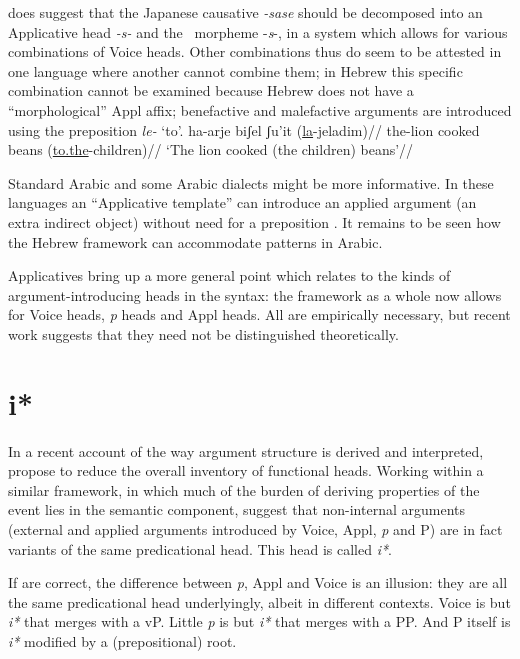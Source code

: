 \cite{oseki16nyu} does suggest that the Japanese causative \emph{-sase} should be decomposed into an Applicative head \emph{-s-} and the \vd~morpheme -\emph{s}-{, in a system which allows for various combinations of Voice heads}. Other combinations thus do seem to be attested in one language where another cannot combine them; in Hebrew this {specific }combination cannot be examined because Hebrew does not have a ``morphological'' Appl affix; benefactive and malefactive arguments are introduced using the preposition \emph{le-} `to'.
\ex \begingl
    \gla ha-arje biʃel ʃu'it (\underline{la}-jeladim)//
    \glb the-lion cooked beans (\underline{to.the}-children)//
    \glft `The lion cooked (the children) beans'//
    \endgl
\xe

Standard Arabic and some Arabic dialects might be more informative. In these languages an ``Applicative template'' can introduce an applied argument (an extra indirect object) without need for a preposition \citep{alkaabi12}. It remains to be seen how the Hebrew framework can accommodate patterns in Arabic.

Applicatives bring up a more general point which relates to the kinds of argument-introducing heads in the syntax: the framework as a whole now allows for Voice heads, \emph{p} heads and Appl heads. All are empirically necessary, but recent work suggests that they need not be distinguished theoretically.


\section{i*} \label{i:i}
In a recent account of the way argument structure is derived and interpreted, \cite{woodmarantz15} propose to reduce the overall inventory of functional heads. Working within a similar framework, in which much of the burden of deriving properties of the event lies in the semantic component, \citeauthor{woodmarantz15} suggest that non-internal arguments (external and applied arguments introduced by Voice, Appl, \emph{p} and P) are in fact variants of the same predicational head. This head is called \emph{i*}.

If \cite{woodmarantz15} are correct, the difference between \emph{p}, Appl and Voice is an illusion: they are all the same predicational head underlyingly, albeit in different contexts. Voice is but \emph{i*} that merges with a vP. Little \emph{p} is but \emph{i*} that merges with a PP. And P itself is \emph{i*} modified by a (prepositional) root.

